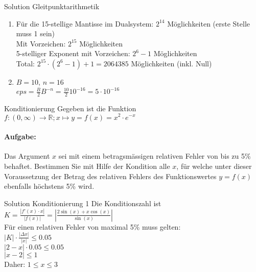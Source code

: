 \begin{KR}{Solution Gleitpunktarithmetik}
\begin{enumerate}
    \item Für die 15-stellige Mantisse im Dualsystem: $2^{14}$ Möglichkeiten (erste Stelle muss 1 sein)\\
    Mit Vorzeichen: $2^{15}$ Möglichkeiten\\
    5-stelliger Exponent mit Vorzeichen: $2^6-1$ Möglichkeiten\\
    Total: $2^{15} \cdot (2^6-1) + 1 = 2064385$ Möglichkeiten (inkl. Null)

    \item $B = 10$, $n = 16$\\
    $eps = \frac{B}{2}B^{-n} = \frac{10}{2}10^{-16} = 5 \cdot 10^{-16}$
\end{enumerate}
\end{KR}

\begin{example2}{Konditionierung}
Gegeben ist die Funktion
$f: (0,\infty) \rightarrow \mathbb{R}; x \mapsto y = f(x) = x^2 \cdot e^{-x}$

\paragraph{Aufgabe:}
Das Argument $x$ sei mit einem betragsmässigen relativen Fehler von bis zu 5\% behaftet. Bestimmen Sie mit Hilfe der Kondition alle $x$, für welche unter dieser Voraussetzung der Betrag des relativen Fehlers des Funktionswertes $y = f(x)$ ebenfalls höchstens 5\% wird.
\end{example2}

\begin{KR}{Solution Konditionierung 1}
Die Konditionszahl ist $K = \frac{|f'(x)\cdot x|}{|f(x)|} = \left|\frac{2\sin(x) + x\cos(x)}{\sin(x)}\right|$\\

Für einen relativen Fehler von maximal 5\% muss gelten:\\
$|K| \cdot \frac{|\Delta x|}{|x|} \leq 0.05$\\
$|2-x| \cdot 0.05 \leq 0.05$\\
$|x-2| \leq 1$\\
Daher: $1 \leq x \leq 3$
\end{KR}

